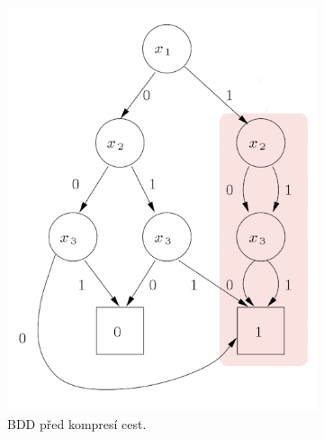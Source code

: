 \begin{figure}
    \centering
    \begin{subfigure}{.45\textwidth}
        \centering
        \includegraphics[scale=0.7]{obrazky-figures/bdd_a.png}
        \caption{BDD před kompresí cest.}
        \label{bdd_example_a}
    \end{subfigure}
    \vspace{\floatsep}
    \begin{subfigure}{.45\textwidth}
        \centering

\end{subfigure}
\end{figure}
